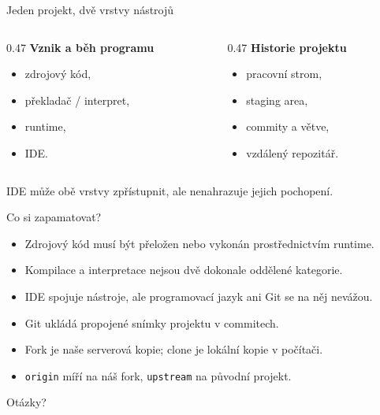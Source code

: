 \documentclass[aspectratio=169]{beamer}
\begin{document}
\begin{frame}{Jeden projekt, dvě vrstvy nástrojů}
  \begin{columns}[T]
    \begin{column}{0.47\textwidth}
      \textbf{Vznik a běh programu}
      \begin{itemize}
        \item zdrojový kód,
        \item překladač / interpret,
        \item runtime,
        \item IDE.
      \end{itemize}
    \end{column}
    \begin{column}{0.47\textwidth}
      \textbf{Historie projektu}
      \begin{itemize}
        \item pracovní strom,
        \item staging area,
        \item commity a větve,
        \item vzdálený repozitář.
      \end{itemize}
    \end{column}
  \end{columns}
  \vspace{0.5cm}
  IDE může obě vrstvy zpřístupnit, ale nenahrazuje jejich pochopení.
\end{frame}

\begin{frame}{Co si zapamatovat?}
  \begin{itemize}
    \item Zdrojový kód musí být přeložen nebo vykonán prostřednictvím runtime.
    \item Kompilace a interpretace nejsou dvě dokonale oddělené kategorie.
    \item IDE spojuje nástroje, ale programovací jazyk ani Git se na něj nevážou.
    \item Git ukládá propojené snímky projektu v commitech.
    \item Fork je naše serverová kopie; clone je lokální kopie v počítači.
    \item \texttt{origin} míří na náš fork, \texttt{upstream} na původní projekt.
  \end{itemize}
  \vspace{0.4cm}
  \centering\Large Otázky?
\end{frame}
\end{document}
